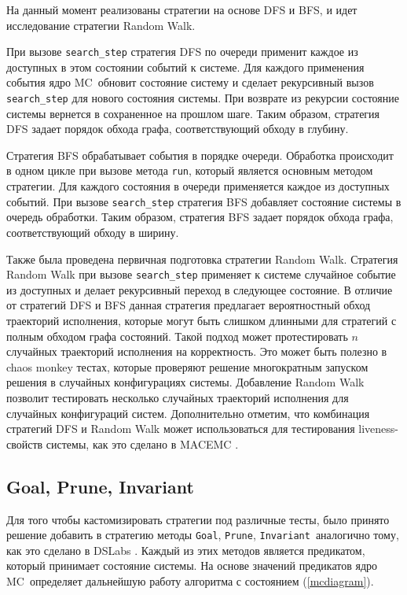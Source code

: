 \documentclass[a4paper,12pt]{extarticle}
\newcommand{\goal}[0]{\texttt{Goal}}
\newcommand{\prune}[0]{\texttt{Prune}}
\newcommand{\invariant}[0]{\texttt{Invariant}}
\newcommand{\mc}[0]{MC}
\begin{document}
На данный момент реализованы стратегии на основе DFS и BFS, и идет исследование стратегии Random Walk.

При вызове \texttt{search\_step} стратегия DFS по очереди применит каждое из доступных в этом состоянии событий к системе.
Для каждого применения события ядро \mc\ обновит состояние систему и сделает рекурсивный вызов \texttt{search\_step} для нового состояния системы.
При возврате из рекурсии состояние системы вернется в сохраненное на прошлом шаге. 
Таким образом, стратегия DFS задает порядок обхода графа, соответствующий обходу в глубину.

Стратегия BFS обрабатывает события в порядке очереди.
Обработка происходит в одном цикле при вызове метода \texttt{run}, который является основным методом стратегии.
Для каждого состояния в очереди применяется каждое из доступных событий.
При вызове \texttt{search\_step} стратегия BFS добавляет состояние системы в очередь обработки.
Таким образом, стратегия BFS задает порядок обхода графа, соответствующий обходу в ширину.

Также была проведена первичная подготовка стратегии Random Walk.
Стратегия Random Walk при вызове \texttt{search\_step} применяет к системе случайное событие из доступных и делает рекурсивный переход в следующее состояние.
В отличие от стратегий DFS и BFS данная стратегия предлагает вероятностный обход траекторий исполнения, которые могут быть слишком длинными для стратегий с полным обходом графа состояний.
Такой подход может протестировать $n$ случайных траекторий исполнения на корректность.
Это может быть полезно в chaos monkey тестах, которые проверяют решение многократным запуском решения в случайных конфигурациях системы.
Добавление Random Walk позволит тестировать несколько случайных траекторий исполнения для случайных конфигураций систем.  
Дополнительно отметим, что комбинация стратегий DFS и Random Walk может использоваться для тестирования liveness-свойств системы, как это сделано в MACEMC \cite{b19}.



\subsection{Goal, Prune, Invariant}

Для того чтобы кастомизировать стратегии под различные тесты, было принято решение добавить в стратегию методы \goal, \prune, \invariant\ аналогично тому, как это сделано в DSLabs \cite{b1}.
Каждый из этих методов является предикатом, который принимает состояние системы. На основе значений предикатов ядро \mc\ определяет дальнейшую работу алгоритма с состоянием (\cref{mcdiagram}).
\end{document}
